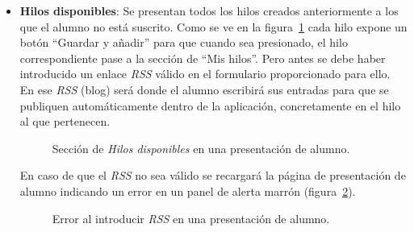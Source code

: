 \documentclass[a4paper, 12pt]{book}
\begin{document}
\begin{itemize}
  \item {\bfseries Hilos disponibles}: Se presentan todos los hilos creados anteriormente a los que el alumno no est\'a suscrito. Como se ve en la 
  figura~\ref{figura:alumno1} cada hilo expone un bot\'on ``Guardar y a\~nadir'' para que cuando sea presionado, el hilo correspondiente pase a la 
  secci\'on de ``Mis hilos''. Pero antes se debe haber introducido un enlace \textit{RSS} v\'alido en el formulario proporcionado para ello. En ese 
  \textit{RSS} (blog) ser\'a donde el alumno escribir\'a sus entradas para que se publiquen autom\'aticamente dentro de la aplicaci\'on, concretamente
  en el hilo al que pertenecen.
  \begin{figure}[htbp] 
    \centering
    \caption{Secci\'on de \textit{Hilos disponibles} en una presentaci\'on de alumno.}
    \label{figura:alumno1}
  \end{figure}
  
  En caso de que el \textit{RSS} no sea v\'alido se recargar\'a la p\'agina de presentaci\'on de alumno indicando un error en un panel de alerta marr\'on 
  (figura~\ref{figura:alumno2}).
  \begin{figure}[htbp] 
    \centering
    \caption{Error al introducir \textit{RSS} en una presentaci\'on de alumno.}
    \label{figura:alumno2}
  \end{figure}
  

\end{itemize}
\end{document}
